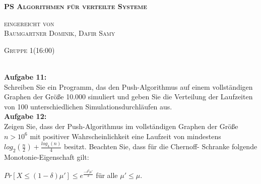 \documentclass[12pt,a4paper]{report}
\begin{document}
\begin{titlepage}
	\begin{center}

		\vspace*{1.0cm}
		\huge
		\textsc{\bf{PS Algorithmen für verteilte Systeme}}

		\vspace*{4.0cm}
		\textsc{
			\normalsize{eingereicht von} \\[0.5\baselineskip]
			{\large Baumgartner Dominik, Dafir Samy}
		}

		\vspace*{3.0cm}
		\textsc{
			\normalsize{Gruppe  1(16:00)}
		}

	\end{center}

\end{titlepage}
\ \\
\textbf{Aufgabe 11:}\\
Schreiben Sie ein Programm, das den Push-Algorithmus auf einem vollständigen Graphen der Größe 10.000 simuliert und geben Sie die
Verteilung der Laufzeiten von 100 unterschiedlichen Simulationsdurchläufen aus.
\newpage
\ \\
\textbf{Aufgabe 12:}\\
Zeigen Sie, dass der Push-Algorithmus im vollständigen Graphen der Größe $n>10^6$ mit positiver Wahrscheinlichkeit eine Laufzeit von mindestens $log_2(\frac{n}{2})+\frac{log_4(n)}{4}$ besitzt. Beachten Sie, dass für die Chernoff-
Schranke folgende Monotonie-Eigenschaft gilt:
\begin{center}
$Pr[X \le (1 - \delta)\mu'] \le e^{\frac{-\delta^2\mu'}{3}}$ für alle $\mu'\le \mu$.
\end{center}
\ \\
\end{document}
